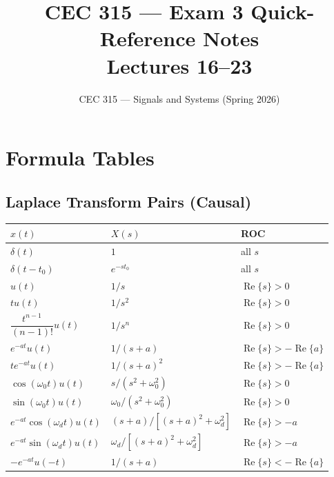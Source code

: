 \documentclass[11pt]{article}
\title{CEC 315 --- Exam 3 Quick-Reference Notes\\\large Lectures 16--23}
\author{CEC 315 --- Signals and Systems (Spring 2026)}
\date{}
\renewcommand{\Re}{\operatorname{Re}}
\begin{document}
\maketitle
\tableofcontents
\newpage

\section{Formula Tables}

\subsection{Laplace Transform Pairs (Causal)}
\begin{center}
\begin{tabular}{|l|l|l|}
\hline
$x(t)$ & $X(s)$ & ROC\\
\hline
$\delta(t)$ & $1$ & all $s$\\
$\delta(t-t_0)$ & $e^{-st_0}$ & all $s$\\
$u(t)$ & $1/s$ & $\Re\{s\}>0$\\
$tu(t)$ & $1/s^2$ & $\Re\{s\}>0$\\
$\dfrac{t^{n-1}}{(n-1)!}u(t)$ & $1/s^n$ & $\Re\{s\}>0$\\
$e^{-at}u(t)$ & $1/(s+a)$ & $\Re\{s\}>-\Re\{a\}$\\
$te^{-at}u(t)$ & $1/(s+a)^2$ & $\Re\{s\}>-\Re\{a\}$\\
$\cos(\omega_0 t)u(t)$ & $s/(s^2+\omega_0^2)$ & $\Re\{s\}>0$\\
$\sin(\omega_0 t)u(t)$ & $\omega_0/(s^2+\omega_0^2)$ & $\Re\{s\}>0$\\
$e^{-at}\cos(\omega_d t)u(t)$ & $(s+a)/[(s+a)^2+\omega_d^2]$ & $\Re\{s\}>-a$\\
$e^{-at}\sin(\omega_d t)u(t)$ & $\omega_d/[(s+a)^2+\omega_d^2]$ & $\Re\{s\}>-a$\\
$-e^{-at}u(-t)$ & $1/(s+a)$ & $\Re\{s\}<-\Re\{a\}$\\
\hline
\end{tabular}
\end{center}
\end{document}
